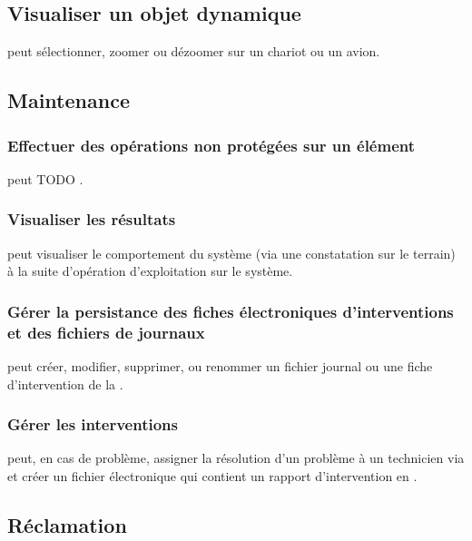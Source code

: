 \subsection{Visualiser un objet dynamique}
 peut sélectionner, zoomer ou dézoomer sur un chariot ou un avion.

\subsection{Maintenance}

\subsubsection{Effectuer des opérations non protégées sur un élément}
 peut TODO .

\subsubsection{Visualiser les résultats}
 peut visualiser le comportement du système (via une constatation sur le terrain) à la suite d'opération d'exploitation sur le système.

\subsubsection{Gérer la persistance des fiches électroniques d'interventions et des fichiers de journaux}
 peut créer, modifier, supprimer, ou renommer un fichier journal ou une fiche d'intervention de la .

\subsubsection{Gérer les interventions}
 peut, en cas de problème, assigner la résolution d'un problème à un technicien via  et créer un fichier électronique qui contient un rapport d'intervention en .

\subsection{Réclamation}

